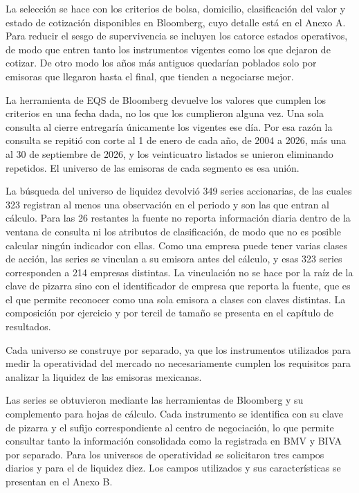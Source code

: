 La selección se hace con los criterios de bolsa, domicilio, clasificación del valor y estado de cotización disponibles en Bloomberg, cuyo detalle está en el Anexo A. Para reducir el sesgo de supervivencia se incluyen los catorce estados operativos, de modo que entren tanto los instrumentos vigentes como los que dejaron de cotizar. De otro modo los años más antiguos quedarían poblados solo por emisoras que llegaron hasta el final, que tienden a negociarse mejor.

La herramienta de EQS de Bloomberg devuelve los valores que cumplen los criterios en una fecha dada, no los que los cumplieron alguna vez. Una sola consulta al cierre entregaría únicamente los vigentes ese día. Por esa razón la consulta se repitió con corte al 1 de enero de cada año, de 2004 a 2026, más una al 30 de septiembre de 2026, y los veinticuatro listados se unieron eliminando repetidos. El universo de las emisoras de cada segmento es esa unión.

La búsqueda del universo de liquidez devolvió 349 series accionarias, de las cuales 323 registran al menos una observación en el periodo y son las que entran al cálculo. Para las 26 restantes la fuente no reporta información diaria dentro de la ventana de consulta ni los atributos de clasificación, de modo que no es posible calcular ningún indicador con ellas. Como una empresa puede tener varias clases de acción, las series se vinculan a su emisora antes del cálculo, y esas 323 series corresponden a 214 empresas distintas. La vinculación no se hace por la raíz de la clave de pizarra sino con el identificador de empresa que reporta la fuente, que es el que permite reconocer como una sola emisora a clases con claves distintas. La composición por ejercicio y por tercil de tamaño se presenta en el capítulo de resultados.

Cada universo se construye por separado, ya que los instrumentos utilizados para medir la operatividad del mercado no necesariamente cumplen los requisitos para analizar la liquidez de las emisoras mexicanas.


Las series se obtuvieron mediante las herramientas de Bloomberg y su complemento para hojas de cálculo. Cada instrumento se identifica con su clave de pizarra y el sufijo correspondiente al centro de negociación, lo que permite consultar tanto la información consolidada como la registrada en BMV y BIVA por separado. Para los universos de operatividad se solicitaron tres campos diarios y para el de liquidez diez. Los campos utilizados y sus características se presentan en el Anexo B.

